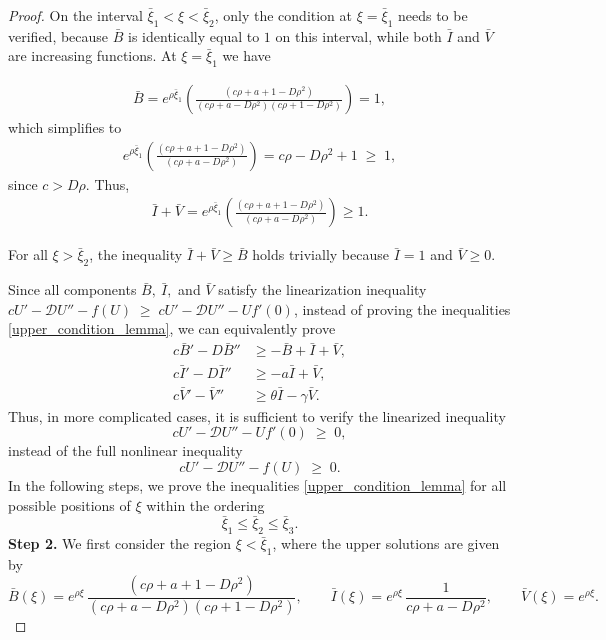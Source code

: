 \documentclass[10pt,a4paper]{amsart}
\begin{document}
\begin{proof}
On the interval $\bar{\xi}_1 < \xi < \bar{\xi}_2$, only the condition at 
$\xi = \bar{\xi}_1$ needs to be verified, because $\bar{B}$ is identically 
equal to $1$ on this interval, while both $\bar{I}$ and $\bar{V}$ are 
increasing functions.  
At $\xi = \bar{\xi}_1$ we have

\begin{align}
   \bar{B}= e^{\rho \bar{\xi}_1}
    \left(
     \frac{(c\rho+a+1 - D\rho^2)}
         {(c\rho+a - D\rho^2)(c\rho+1 - D\rho^2)}
    \right)
    = 1,
\end{align}
which simplifies to
\begin{align}
    e^{\rho \bar{\xi}_1}
    \left(
     \frac{(c\rho+a+1 - D\rho^2)}
         {(c\rho+a - D\rho^2)}
    \right)
    = c\rho - D\rho^{2} + 1 \;\ge\; 1,
\end{align}
since $c > D\rho$.  
Thus,
\begin{align}
    \bar{I} + \bar{V}
    = e^{\rho \bar{\xi}_1}
    \left(
        \frac{(c\rho+a+1 - D\rho^2)}
         {(c\rho+a - D\rho^2)}
    \right)
    \ge 1.
\end{align}

For all $\xi > \bar{\xi}_2$, the inequality $\bar{I} + \bar{V} \ge \bar{B}$ holds trivially because  
$\bar{I} = 1$ and $\bar{V} \ge 0$.

Since all components $\bar{B},\ \bar{I},$ and $  \bar{V}$ satisfy the linearization inequality $cU' - \mathcal{D}U'' - f(U) \;\ge\; cU' - \mathcal{D}U'' - Uf'(0)$, instead of proving the inequalities \eqref{upper_condition_lemma}, we can equivalently prove
\begin{align}
    c \bar{B}' - D\bar{B}'' &\ge -\bar{B} + \bar{I} + \bar{V}, \\
    c \bar{I}' - D\bar{I}'' &\ge -a\bar{I} + \bar{V}, \\
    c \bar{V}' - \bar{V}'' &\ge \theta \bar{I} - \gamma \bar{V}.
\end{align}
Thus, in more complicated cases, it is sufficient to verify the linearized inequality
\[
cU' - \mathcal{D}U'' - Uf'(0) \;\ge\; 0,
\]
instead of the full nonlinear inequality
\[
cU' - \mathcal{D}U'' - f(U) \;\ge\; 0.
\]
In the following steps, we prove the inequalities \eqref{upper_condition_lemma} for all possible positions of $\xi$ within the ordering \[\bar{\xi}_1\le \bar{\xi}_2 \le \bar{\xi}_3.\]
\textbf{Step 2.} We first consider the region $\xi < \bar{\xi}_1$, where the upper solutions are given by 
\[
\bar{B}(\xi)= e^{\rho \xi}\,
\frac{(c\rho+a+1 - D\rho^2)}
         {(c\rho+a - D\rho^2)(c\rho+1 - D\rho^2)}, 
\qquad
\bar{I}(\xi)= e^{\rho \xi}\,\frac{1}{c\rho+a-D\rho^2}, 
\qquad
\bar{V}(\xi)= e^{\rho \xi}.
\]


\end{proof}
\end{document}
